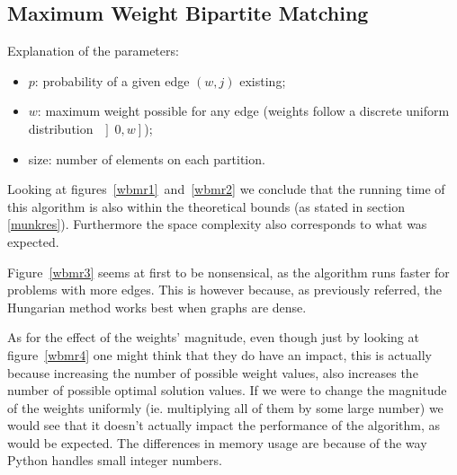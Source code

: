 \documentclass[a4,11pt]{article}
\begin{document}
\subsection{Maximum Weight Bipartite Matching}
Explanation of the parameters:
\begin{itemize}
    \setlength\itemsep{-.1em}
    \item $p$: probability of a given edge $(w,j)$ existing;
    \item $w$: maximum weight possible for any edge (weights follow a discrete uniform distribution~$\left]0, w\right]$);
    \item size: number of elements on each partition.
\end{itemize}

Looking at figures~\ref{wbmr1}~and~\ref{wbmr2} we conclude that the running time of this algorithm is also within the theoretical bounds (as stated in section \ref{munkres}). Furthermore the space complexity also corresponds to what was expected.

Figure~\ref{wbmr3} seems at first to be nonsensical, as the algorithm runs faster for problems with more edges. This is however because, as previously referred, the Hungarian method works best when graphs are dense.

As for the effect of the weights' magnitude, even though just by looking at figure~\ref{wbmr4} one might think that they do have an impact, this is actually because increasing the number of possible weight values, also increases the number of possible optimal solution values. If we were to change the magnitude of the weights uniformly (ie. multiplying all of them by some large number) we would see that it doesn't actually impact the performance of the algorithm, as would be expected. The differences in memory usage are because of the way Python handles small integer numbers.
\end{document}
